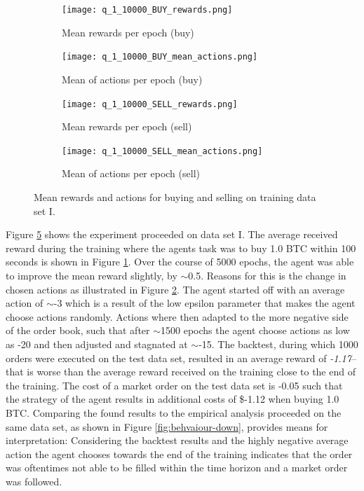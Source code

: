 \begin{figure}
    \centering
    \begin{subfigure}[b]{0.45\textwidth}
        \texttt{[image: q\_1\_10000\_BUY\_rewards.png]}
        \caption{Mean rewards per epoch (buy)}
        \label{fig:analysis-q-learn-1-reward-buy}
    \end{subfigure}
    \begin{subfigure}[b]{0.45\textwidth}
        \texttt{[image: q\_1\_10000\_BUY\_mean\_actions.png]}
        \caption{Mean of actions per epoch (buy)}
        \label{fig:analysis-q-learn-1-action-buy}
    \end{subfigure}
    \begin{subfigure}[b]{0.45\textwidth}
        \texttt{[image: q\_1\_10000\_SELL\_rewards.png]}
        \caption{Mean rewards per epoch (sell)}
        \label{fig:analysis-q-learn-1-reward-sell}
    \end{subfigure}
    \begin{subfigure}[b]{0.45\textwidth}
        \texttt{[image: q\_1\_10000\_SELL\_mean\_actions.png]}
        \caption{Mean of actions per epoch (sell)}
        \label{fig:analysis-q-learn-1-action-sell}
    \end{subfigure}
    \caption{Mean rewards and actions for buying and selling on training data set I.}
    \label{fig:analysis-q-learn-1}
\end{figure}

Figure \ref{fig:analysis-q-learn-1} shows the experiment proceeded on data set I.
The average received reward during the training where the agents task was to buy 1.0 BTC within 100 seconds is shown in Figure \ref{fig:analysis-q-learn-1-reward-buy}.
Over the course of 5000 epochs, the agent was able to improve the mean reward slightly, by $\sim$0.5.
Reasons for this is the change in chosen actions as illustrated in Figure \ref{fig:analysis-q-learn-1-action-buy}.
The agent started off with an average action of $\sim$-3 which is a result of the low epsilon parameter that makes the agent choose actions randomly.
Actions where then adapted to the more negative side of the order book, such that after $\sim$1500 epochs the agent choose actions as low as -20 and then adjusted and stagnated at $\sim$-15.
The backtest, during which 1000 orders were executed on the test data set, resulted in an average reward of \textit{-1.17}--that is worse than the average reward received on the training close to the end of the training.
The cost of a market order on the test data set is -0.05 such that the strategy of the agent results in additional costs of \$-1.12 when buying 1.0 BTC.
Comparing the found results to the empirical analysis proceeded on the same data set, as shown in Figure \ref{fig:behvaiour-down}, provides means for interpretation:
Considering the backtest results and the highly negative average action the agent chooses towards the end of the training indicates that the order was oftentimes not able to be filled within the time horizon and a market order was followed.


